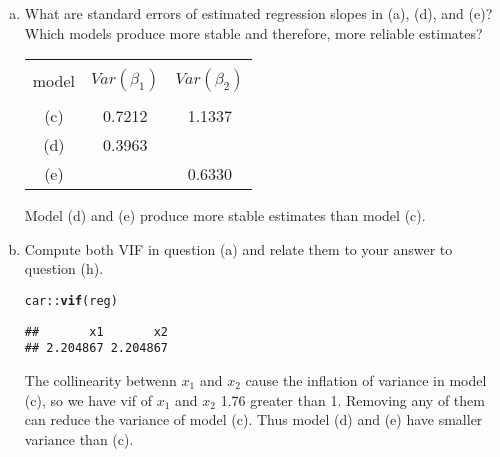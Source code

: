 \documentclass[12pt]{article}\usepackage[]{graphicx}\usepackage[]{color}
\makeatletter
\newcommand{\hlopt}[1]{\textcolor[rgb]{0,0,0}{#1}}%
\newcommand{\hlstd}[1]{\textcolor[rgb]{0.345,0.345,0.345}{#1}}%
\newcommand{\hlkwd}[1]{\textcolor[rgb]{0.737,0.353,0.396}{\textbf{#1}}}%
\newenvironment{kframe}{%
 \def\at@end@of@kframe{}%
 \ifinner\ifhmode%
  \def\at@end@of@kframe{\end{minipage}}%
  \begin{minipage}{\columnwidth}%
 \fi\fi%
 \def\FrameCommand##1{\hskip\@totalleftmargin \hskip-\fboxsep
 \colorbox{shadecolor}{##1}\hskip-\fboxsep
     \hskip-\linewidth \hskip-\@totalleftmargin \hskip\columnwidth}%
 \MakeFramed {\advance\hsize-\width
   \@totalleftmargin\z@ \linewidth\hsize
   \@setminipage}}%
 {\par\unskip\endMakeFramed%
 \at@end@of@kframe}
\newenvironment{knitrout}{}{} %
\theoremstyle{definition}
\makeatother
\begin{document}
\begin{enumerate}[1.]
\begin{enumerate}[(a)]
      \item What are standard errors of estimated regression slopes in (a), (d), and (e)? Which models produce more stable and therefore, more reliable estimates?\\
      \begin{center}
      \begin{tabular}{|c|c|c|}
        \hline\\
        model & $Var(\beta_1)$ & $Var(\beta_2)$\\
        \hline\\
        (c) & 0.7212 & 1.1337\\
        (d) & 0.3963 & \\
        (e) & & 0.6330 \\
        \hline
      \end{tabular}
      \end{center}
      Model (d) and (e) produce more stable estimates than model (c).
      \item Compute both VIF in question (a) and relate them to your answer to question (h).
\begin{knitrout}
\color{fgcolor}\begin{kframe}
\begin{alltt}
\hlstd{car}\hlopt{::}\hlkwd{vif}\hlstd{(reg)}
\end{alltt}
\begin{verbatim}
##       x1       x2 
## 2.204867 2.204867
\end{verbatim}
\end{kframe}
\end{knitrout}
      The collinearity betwenn $x_1$ and $x_2$ cause the inflation of variance in model (c), so we have vif of $x_1$ and $x_2$ 1.76 greater than 1. Removing any of them can reduce the variance of model (c). Thus model (d) and (e) have smaller variance than (c).
    \end{enumerate}


\end{enumerate}
\end{document}
